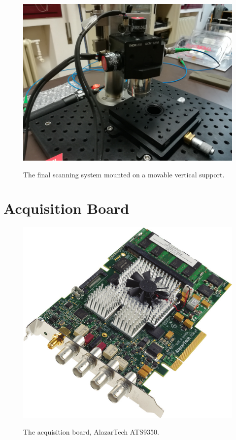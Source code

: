 \begin{figure}[bth]
	\myfloatalign
	{\includegraphics[width=0.75\linewidth]{gfx/ch3/testa}}
	\caption{The final scanning system mounted on a movable vertical support.}\label{fig:testa}
\end{figure}
	
\section{Acquisition Board}

    \begin{figure}[bth]
    \myfloatalign
    {\includegraphics[width=.6\linewidth]{gfx/board}}
    \caption{The acquisition board, AlazarTech ATS9350.}\label{fig:acq-board}
    \end{figure}
	\subsection{}

